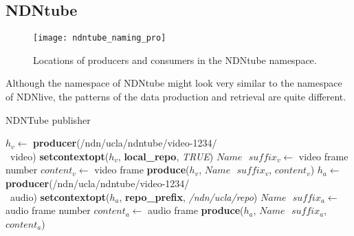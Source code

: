 \subsection{NDNtube}
\begin{figure*}[ht]
  \centering
  \texttt{[image: ndntube\_naming\_pro]}
  \caption{Locations of producers and consumers in the NDNtube namespace.}
  \label{fig:ndntube_cp}
\end{figure*}
Although the namespace of NDNtube might look very similar to the namespace of NDNlive, the patterns of the data production and retrieval are quite different. %

\begin{algorithm}[ht]
\caption{NDNTube publisher}
\label{alg:recordproducer}
\begin{algorithmic}[3]
\State $h_v \leftarrow $ \textbf{producer}(/ndn/ucla/ndntube/video-1234/ \\\ video)
\State \textbf{setcontextopt}($h_v$, \textbf{local\_repo}, \textit{TRUE})
\vspace{0.2cm}
	\State $Name \textbf{ } suffix_v \leftarrow $ video frame number
	\State $content_v \leftarrow $ video frame
	\State \textbf{produce}($h_v$, $Name\textbf{ }suffix_v$, $content_v$)
	\EndWhile
\vspace{0.2cm}
\vspace{0.2cm}
\State $h_a \leftarrow $ \textbf{producer}(/ndn/ucla/ndntube/video-1234/ \\\ audio)
\State \textbf{setcontextopt}($h_a$, \textbf{repo\_prefix}, \textit{/ndn/ucla/repo})
\vspace{0.2cm}
	\State $Name \textbf{ } suffix_a \leftarrow $ audio frame number
	\State $content_a \leftarrow $ audio frame
	\State \textbf{produce}($h_a$, $Name\textbf{ }suffix_a$, $content_a$)
	\EndWhile
\end{algorithmic}
\end{algorithm}

